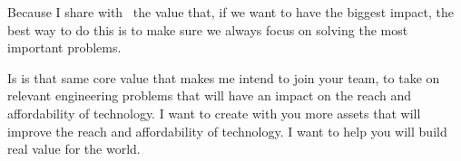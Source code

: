 Because I share with \companyName \ the value that, if we want to have the biggest impact, the best way to do this is to make sure we always focus on solving the most important problems. 

Is is that same core value that makes me intend to join your team, to take on relevant engineering problems that will have an impact on the reach and affordability of technology. 
I want to create with you more assets that will improve the reach and affordability of technology. I want to help you will build real value for the world.